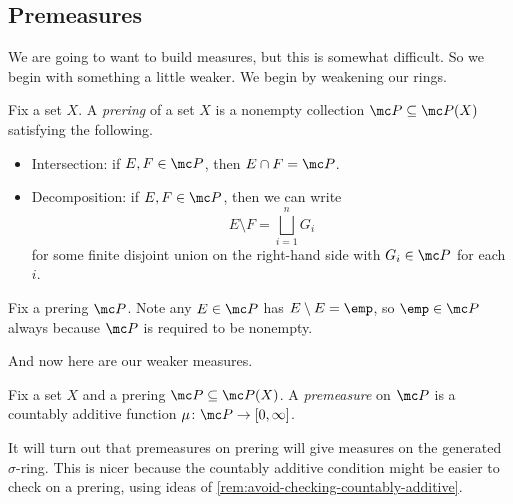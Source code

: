 \documentclass[../notes.tex]{subfiles}
\begin{document}
\subsection{Premeasures}
We are going to want to build measures, but this is somewhat difficult. So we begin with something a little weaker. We begin by weakening our rings.
\begin{definition}[Prering]
	Fix a set $X$. A \textit{prering} of a set $X$ is a nonempty collection $\mc P\subseteq\mc P(X)$ satisfying the following.
	\begin{itemize}
		\item Intersection: if $E,F\in\mc P$, then $E\cap F=\mc P$.
		\item Decomposition: if $E,F\in\mc P$, then we can write
		\[E\setminus F=\bigsqcup_{i=1}^nG_i\]
		for some finite disjoint union on the right-hand side with $G_i\in\mc P$ for each $i$.
	\end{itemize}
\end{definition}
\begin{remark}
	Fix a prering $\mc P$. Note any $E\in\mc P$ has $E\setminus E=\emp$, so $\emp\in\mc P$ always because $\mc P$ is required to be nonempty.
\end{remark}
And now here are our weaker measures.
\begin{definition}[Premeasure]
	Fix a set $X$ and a prering $\mc P\subseteq\mc P(X)$. A \textit{premeasure} on $\mc P$ is a countably additive function $\mu\colon\mc P\to[0,\infty]$.
\end{definition}
It will turn out that premeasures on prering will give measures on the generated $\sigma$-ring. This is nicer because the countably additive condition might be easier to check on a prering, using ideas of \autoref{rem:avoid-checking-countably-additive}.
\end{document}
